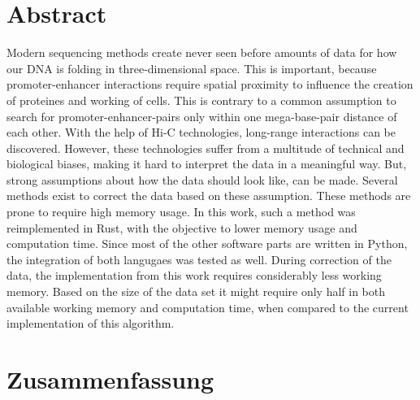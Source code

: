 \chapter*{Abstract}


Modern sequencing methods create never seen before amounts of data for how our
DNA is folding in three-dimensional space. This is important, because
promoter-enhancer interactions require spatial proximity to influence the
creation of proteines and working of cells. This is contrary to a common
assumption to search for promoter-enhancer-pairs only within one mega-base-pair
distance of each other. With the help of Hi-C technologies, long-range
interactions can be discovered. However, these technologies suffer from a
multitude of technical and biological biases, making it hard to interpret the
data in a meaningful way. But, strong assumptions about how the data should
look like, can be made. Several methods exist to correct the data based on
these assumption. These methods are prone to require high memory usage. In this
work, such a method was reimplemented in Rust, with the objective to lower
memory usage and computation time. Since most of the other software parts are
written in Python, the integration of both langugaes was tested as well. During
correction of the data, the implementation from this work requires considerably
less working memory. Based on the size of the data set it might require only
half in both available working memory and computation time, when compared to
the current implementation of this algorithm.






\chapter*{Zusammenfassung}

